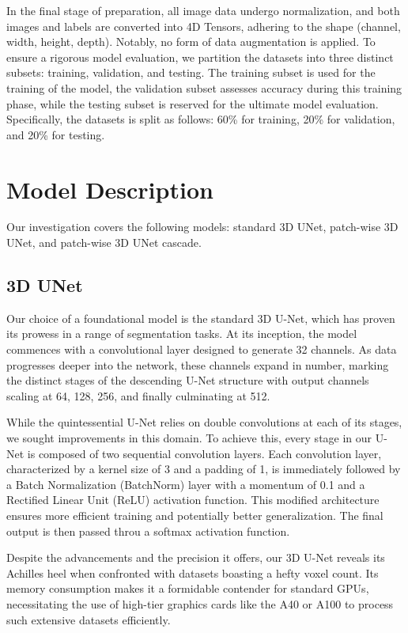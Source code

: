 \noindent In the final stage of preparation, all image data undergo normalization, and both images and labels are converted into 4D Tensors, adhering to the shape (channel, width, height, depth).
Notably, no form of data augmentation is applied. To ensure a rigorous model evaluation, we partition the datasets into three distinct subsets: training, validation, and testing.
The training subset is used for the training of the model, the validation subset assesses accuracy during this training phase, while the testing subset is reserved for the ultimate model evaluation.
Specifically, the datasets is split as follows: 60\% for training, 20\% for validation, and 20\% for testing.

\section{Model Description}
Our investigation covers the following models: standard 3D UNet, patch-wise 3D UNet, and patch-wise 3D UNet cascade.

\subsection{3D UNet}
Our choice of a foundational model is the standard 3D U-Net, which has proven its prowess in a range of segmentation tasks.
At its inception, the model commences with a convolutional layer designed to generate 32 channels. As data progresses deeper into the network,
these channels expand in number, marking the distinct stages of the descending U-Net structure with output channels scaling at 64, 128, 256, and finally culminating at 512.

While the quintessential U-Net relies on double convolutions at each of its stages, we sought improvements in this domain. To achieve this,
every stage in our U-Net is composed of two sequential convolution layers. Each convolution layer, characterized by a kernel size of 3 and a padding of 1,
is immediately followed by a Batch Normalization (BatchNorm) layer with a momentum of 0.1 and a Rectified Linear Unit (ReLU) activation function.\cite{ioffe_batch_2015}
This modified architecture ensures more efficient training and potentially better generalization. The final output is then passed throu a softmax activation function.

Despite the advancements and the precision it offers, our 3D U-Net reveals its Achilles heel when confronted with datasets boasting a hefty voxel count.
Its memory consumption makes it a formidable contender for standard GPUs, necessitating the use of high-tier graphics cards like the A40 or A100 to process such extensive datasets efficiently.

